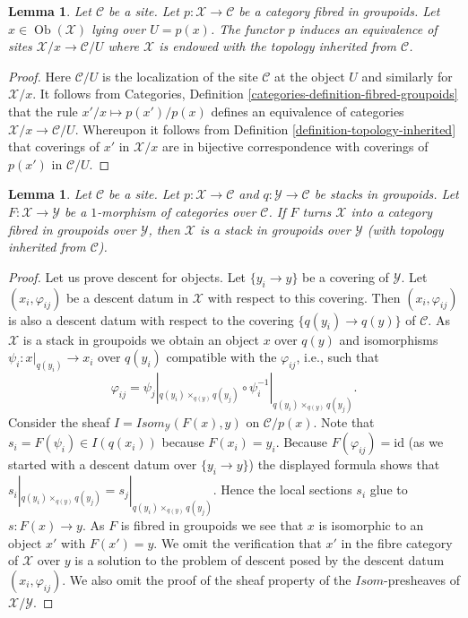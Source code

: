 \documentclass{stacks-project}
\theoremstyle{plain}
\newtheorem{lemma}[subsection]{Lemma}
\theoremstyle{definition}
\theoremstyle{remark}
\numberwithin{equation}{subsection}
\def\Ob{\mathop{\mathrm{Ob}}\nolimits}
\begin{document}
\begin{lemma}
\label{lemma-localizing}
Let $\mathcal{C}$ be a site. Let $p : \mathcal{X} \to \mathcal{C}$
be a category fibred in groupoids. Let $x \in \Ob(\mathcal{X})$
lying over $U = p(x)$. The functor $p$ induces an equivalence of sites
$\mathcal{X}/x \to \mathcal{C}/U$ where $\mathcal{X}$ is endowed with
the topology inherited from $\mathcal{C}$.
\end{lemma}

\begin{proof}
Here $\mathcal{C}/U$ is the localization of the site
$\mathcal{C}$ at the object $U$ and similarly for $\mathcal{X}/x$.
It follows from
Categories, Definition \ref{categories-definition-fibred-groupoids}
that the rule $x'/x \mapsto p(x')/p(x)$ defines an equivalence of
categories $\mathcal{X}/x \to \mathcal{C}/U$. Whereupon it follows from
Definition \ref{definition-topology-inherited}
that coverings of $x'$ in $\mathcal{X}/x$ are in bijective correspondence
with coverings of $p(x')$ in $\mathcal{C}/U$.
\end{proof}

\begin{lemma}
\label{lemma-stack-in-groupoids-over-stack-in-groupoids}
Let $\mathcal{C}$ be a site. Let $p : \mathcal{X} \to \mathcal{C}$
and $q : \mathcal{Y} \to \mathcal{C}$
be stacks in groupoids. Let $F : \mathcal{X} \to \mathcal{Y}$
be a $1$-morphism of categories over $\mathcal{C}$. If $F$ turns
$\mathcal{X}$ into a category fibred in groupoids over $\mathcal{Y}$,
then $\mathcal{X}$ is a stack in groupoids over $\mathcal{Y}$ (with
topology inherited from $\mathcal{C}$).
\end{lemma}

\begin{proof}
Let us prove descent for objects. Let $\{y_i \to y\}$ be a covering
of $\mathcal{Y}$. Let $(x_i, \varphi_{ij})$ be a descent datum in $\mathcal{X}$
with respect to this covering. Then $(x_i, \varphi_{ij})$ is also a descent
datum with respect to the covering $\{q(y_i) \to q(y)\}$ of
$\mathcal{C}$. As $\mathcal{X}$ is a stack in groupoids we obtain an
object $x$ over $q(y)$ and isomorphisms $\psi_i : x|_{q(y_i)} \to x_i$
over $q(y_i)$ compatible with the $\varphi_{ij}$, i.e., such that
$$
\varphi_{ij} = \psi_j|_{q(y_i) \times_{q(y)} q(y_j)}
\circ \psi_i^{-1}|_{q(y_i) \times_{q(y)} q(y_j)}.
$$
Consider the sheaf $\mathit{I} = \mathit{Isom}_\mathcal{Y}(F(x), y)$
on $\mathcal{C}/p(x)$. Note that $s_i = F(\psi_i) \in \mathit{I}(q(x_i))$
because $F(x_i) = y_i$. Because $F(\varphi_{ij}) = \text{id}$ (as we started
with a descent datum over $\{y_i \to y\}$) the displayed formula shows
that $s_i|_{q(y_i) \times_{q(y)} q(y_j)} = s_j|_{q(y_i) \times_{q(y)} q(y_j)}$.
Hence the local sections $s_i$ glue to $s : F(x) \to y$. As $F$ is fibred in
groupoids we see that $x$ is isomorphic to an object $x'$ with $F(x') = y$.
We omit the verification that $x'$ in the fibre category of $\mathcal{X}$
over $y$ is a solution to the problem of descent posed by the descent datum
$(x_i, \varphi_{ij})$. We also omit the proof of the sheaf property
of the $\mathit{Isom}$-presheaves of $\mathcal{X}/\mathcal{Y}$.
\end{proof}
\end{document}
